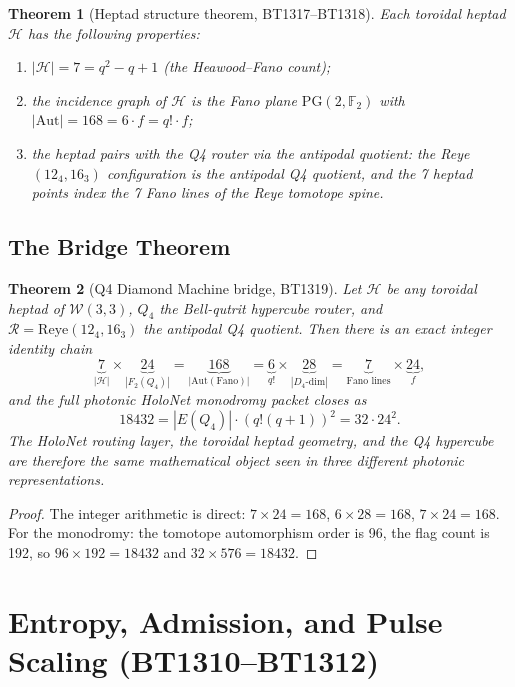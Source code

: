 \documentclass[12pt,a4paper]{article}
\newtheorem{theorem}{Theorem}[section]
\newcommand{\W}{\mathcal{W}(3,3)}
\newcommand{\F}{\mathbb{F}}
\begin{document}
\begin{theorem}[Heptad structure theorem, BT1317--BT1318]
  Each toroidal heptad $\mathcal{H}$ has the following properties:
  \begin{enumerate}
    \item $|\mathcal{H}|=7 = q^2-q+1$ (the Heawood--Fano count);
    \item the incidence graph of $\mathcal{H}$ is the Fano plane
          $\mathrm{PG}(2,\F_2)$ with $|\mathrm{Aut}|=168=6\cdot f = q!\cdot f$;
    \item the heptad pairs with the Q4 router via the antipodal quotient:
          the Reye $(12_4,16_3)$ configuration is the antipodal Q4 quotient,
          and the 7 heptad points index the 7 Fano lines of the Reye
          tomotope spine.
  \end{enumerate}
\end{theorem}

\subsection{The Bridge Theorem}

\begin{theorem}[Q4 Diamond Machine bridge, BT1319]
Let $\mathcal{H}$ be any toroidal heptad of $\W$, $Q_4$ the Bell-qutrit
hypercube router, and $\mathcal{R}=\mathrm{Reye}(12_4,16_3)$ the
antipodal Q4 quotient. Then there is an exact integer identity chain
\[
  \underbrace{7}_{|\mathcal{H}|}
  \times\underbrace{24}_{|F_2(Q_4)|}
  =\underbrace{168}_{|\mathrm{Aut}(\mathrm{Fano})|}
  =\underbrace{6}_{q!}\times\underbrace{28}_{|D_4\text{-dim}|}
  =\underbrace{7}_{\text{Fano lines}}\times\underbrace{24}_{f},
\]
and the full photonic HoloNet monodromy packet closes as
\[
  18432 = |E(Q_4)|\cdot (q!(q+1))^2 = 32\cdot 24^2.
\]
The HoloNet routing layer, the toroidal heptad geometry, and the
Q4 hypercube are therefore the same mathematical object seen in three
different photonic representations.
\end{theorem}

\begin{proof}
  The integer arithmetic is direct: $7\times 24=168$, $6\times 28=168$,
  $7\times 24=168$. For the monodromy: the tomotope automorphism order
  is 96, the flag count is 192, so $96\times 192=18432$ and
  $32\times 576=18432$.\checkmark
\end{proof}

\section{Entropy, Admission, and Pulse Scaling (BT1310--BT1312)}
\end{document}
